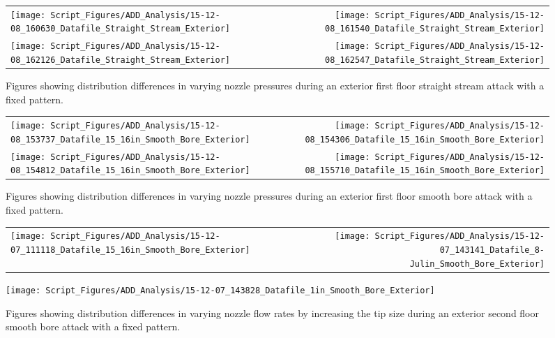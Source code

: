 \documentclass{article}
\begin{document}
\begin{figure}[ht]
\begin{tabular*}{\textwidth}{lr}
\texttt{[image: Script\_Figures/ADD\_Analysis/15-12-08\_160630\_Datafile\_Straight\_Stream\_Exterior]} &
\texttt{[image: Script\_Figures/ADD\_Analysis/15-12-08\_161540\_Datafile\_Straight\_Stream\_Exterior]} \\
\texttt{[image: Script\_Figures/ADD\_Analysis/15-12-08\_162126\_Datafile\_Straight\_Stream\_Exterior]} &
\texttt{[image: Script\_Figures/ADD\_Analysis/15-12-08\_162547\_Datafile\_Straight\_Stream\_Exterior]} \\
\end{tabular*}
\caption{Figures showing distribution differences in varying nozzle pressures during an exterior first floor straight stream attack with a fixed pattern.}
\label{fig:Exterior_First_Floor_Varying_Nozzle_Pressure_SS_Fixed_Pattern}
\end{figure}

\clearpage

\begin{figure}[ht]
\begin{tabular*}{\textwidth}{lr}
\texttt{[image: Script\_Figures/ADD\_Analysis/15-12-08\_153737\_Datafile\_15\_16in\_Smooth\_Bore\_Exterior]} &
\texttt{[image: Script\_Figures/ADD\_Analysis/15-12-08\_154306\_Datafile\_15\_16in\_Smooth\_Bore\_Exterior]} \\
\texttt{[image: Script\_Figures/ADD\_Analysis/15-12-08\_154812\_Datafile\_15\_16in\_Smooth\_Bore\_Exterior]} &
\texttt{[image: Script\_Figures/ADD\_Analysis/15-12-08\_155710\_Datafile\_15\_16in\_Smooth\_Bore\_Exterior]} \\
\end{tabular*}
\caption{Figures showing distribution differences in varying nozzle pressures during an exterior first floor smooth bore attack with a fixed pattern.}
\label{fig:Exterior_First_Floor_Varying_Nozzle_Pressure_SB_Fixed_Pattern}
\end{figure}

\clearpage

\begin{figure}[ht]
\begin{tabular*}{\textwidth}{lr}
\texttt{[image: Script\_Figures/ADD\_Analysis/15-12-07\_111118\_Datafile\_15\_16in\_Smooth\_Bore\_Exterior]} &
\texttt{[image: Script\_Figures/ADD\_Analysis/15-12-07\_143141\_Datafile\_8-Julin\_Smooth\_Bore\_Exterior]} \\
\end{tabular*}
\centering
\texttt{[image: Script\_Figures/ADD\_Analysis/15-12-07\_143828\_Datafile\_1in\_Smooth\_Bore\_Exterior]}
\caption{Figures showing distribution differences in varying nozzle flow rates by increasing the tip size during an exterior second floor smooth bore attack with a fixed pattern.}
\label{fig:Exterior_Second_Floor_Varying_Flow_Rates_SB_Fixed_Pattern}
\end{figure}
\end{document}
